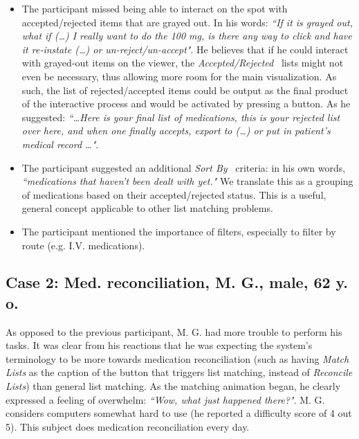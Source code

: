 \documentclass{chi2009}
\newcommand{\AcceptedRejected}{\textit{Accepted/Rejected}}
\newcommand{\SortBy}{\textit{Sort By}}
\begin{document}
\begin{itemize}
\item The participant missed being able to interact on the spot with accepted/rejected items that are grayed out. In his words: \textit{``If it is grayed out, what if (\dots) I really want to do the 100 mg, is there any way to click and have it re-instate (\dots) or un-reject/un-accept"}. He believes that if he could interact with grayed-out items on the viewer, the \AcceptedRejected~ lists might not even be necessary, thus allowing more room for the main visualization. As such, the list of rejected/accepted items could be output as the final product of the interactive process and would be activated by pressing a button. As he suggested: \textit{``\dots Here is your final list of medications, this is your rejected list over here, and when one finally accepts, export to (\dots) or put in patient's medical record \dots"}.
\item The participant suggested an additional \SortBy~ criteria: in his own words, \textit{``medications that haven't been dealt with yet."} We translate this as a grouping of medications based on their accepted/rejected status. This is a useful, general concept applicable to other list matching problems.
\item The participant mentioned the importance of filters, especially to filter by route (e.g. I.V. medications).  
\end{itemize}

\subsection{Case 2: Med. reconciliation, M. G., male, 62 y. o.}

As opposed to the previous participant, M. G. had more trouble to perform his tasks. It was clear from his reactions that he was expecting the system's terminology to be more towards medication reconciliation (such as having \textit{Match Lists} as the caption of the button that triggers list matching, instead of \textit{Reconcile Lists}) than general list matching. As the matching animation began, he clearly expressed a feeling of overwhelm: \textit{``Wow, what just happened there?"}. M. G. considers computers somewhat hard to use (he reported a difficulty score of 4 out 5). This subject does medication reconciliation every day. 
\end{document}
